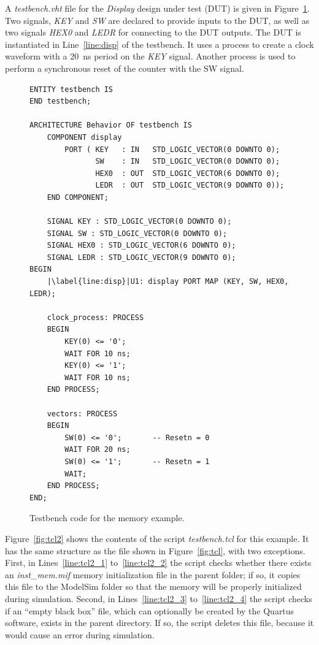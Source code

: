 \documentclass[11pt, twoside, pdftex]{article}
\begin{document}
\newpage
\noindent
A {\it testbench.vht} file for the {\it Display} design under test (DUT) is given in 
Figure~\ref{fig:tb3}. Two signals, {\it KEY} and {\it SW} are declared to provide 
inputs to the DUT, as well as two signals {\it HEX0} and {\it LEDR}
for connecting to the DUT outputs. The DUT is instantiated in Line~\ref{line:disp} of 
the testbench. It 
uses a process to create a clock waveform with a 20~ns period on the {\it KEY} signal.  Another 
process is used to perform a synchronous reset of the counter with the SW signal. 

\lstset{language=VHDL,numbers=left,escapechar=|}
\begin{figure}[h]
\begin{center}
\begin{minipage}[t]{12.5 cm}
\begin{lstlisting}[name=testbench3]
ENTITY testbench IS
END testbench;
 
ARCHITECTURE Behavior OF testbench IS
    COMPONENT display
        PORT ( KEY   : IN   STD_LOGIC_VECTOR(0 DOWNTO 0);
               SW    : IN   STD_LOGIC_VECTOR(0 DOWNTO 0);
               HEX0  : OUT  STD_LOGIC_VECTOR(6 DOWNTO 0);
               LEDR  : OUT  STD_LOGIC_VECTOR(9 DOWNTO 0));
    END COMPONENT;

    SIGNAL KEY : STD_LOGIC_VECTOR(0 DOWNTO 0);
    SIGNAL SW : STD_LOGIC_VECTOR(0 DOWNTO 0);
    SIGNAL HEX0 : STD_LOGIC_VECTOR(6 DOWNTO 0);
    SIGNAL LEDR : STD_LOGIC_VECTOR(9 DOWNTO 0);
BEGIN
    |\label{line:disp}|U1: display PORT MAP (KEY, SW, HEX0, LEDR);

    clock_process: PROCESS
    BEGIN
        KEY(0) <= '0';
        WAIT FOR 10 ns;
        KEY(0) <= '1';
        WAIT FOR 10 ns;
    END PROCESS;    
    
    vectors: PROCESS
    BEGIN
        SW(0) <= '0';       -- Resetn = 0
        WAIT FOR 20 ns;     
        SW(0) <= '1';       -- Resetn = 1
        WAIT;
    END PROCESS;
END;
\end{lstlisting}
\end{minipage}
\caption{Testbench code for the memory example.}
\label{fig:tb3}
\end{center}
\end{figure}

\noindent
Figure~\ref{fig:tcl2} shows the contents of the script {\it testbench.tcl} for this example.
It has the same structure as the file shown in Figure~\ref{fig:tcl}, with two exceptions. 
First, in Lines~\ref{line:tcl2_1} to~\ref{line:tcl2_2} the script checks whether there 
exists an {\it inst\_mem.mif} memory initialization file in the parent folder; if so, 
it copies this file to the ModelSim folder so that the memory will be properly initialized
during simulation. Second, in Lines~\ref{line:tcl2_3} 
to~\ref{line:tcl2_4} the script checks if an ``empty black box'' file, which can 
optionally be created by the Quartus software, exists in the parent directory. 
If so, the script deletes this file, because it would cause an error during simulation.
\end{document}
